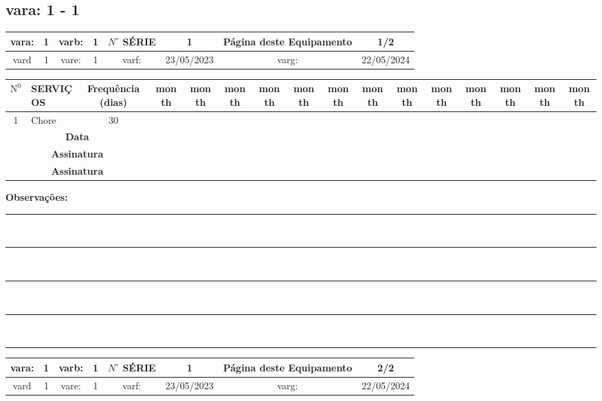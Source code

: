 \documentclass[a4paper, 12pt]{article}
\begin{document}
\subsection{vara: 1 - 1}



\begin{adjustbox}{width=18cm ,center}
\begin{tabular}{|c|c|c|c|c|c|c|c|}
\hline vara: & 1 & varb: & 1 & $N^{\circ}$ SÉRIE & 1 & \textbf{Página deste Equipamento} & \textbf{1/2} \\
\hline vard & 1 & vare: & 1 & varf: & 23/05/2023 & varg: & 22/05/2024 \\
\hline
\end{tabular}
\end{adjustbox}

\begin{adjustbox}{width=18cm ,center}
\begin{tabular}{|c|p{12cm}|c|c|c|c|c|c|c|c|c|c|c|c|c|c|}
\hline $\mathrm{N}^0$ & SERVIÇOS & Frequência (dias) & month & month & month & month & month & month & month & month & month & month & month & month & month \\
\hline 1 &  Chore & 30 &  &  & &  & &  &  & &  & &  &  &  \\
\hline
\hline
\multicolumn{3}{|c|}{\textbf{Data }} &  & & & & & & & &  &  & &  &  \\
\hline \multicolumn{3}{|c|}{\textbf{Assinatura }} &  & & & & & & & & & &   &  &  \\
\hline \multicolumn{3}{|c|}{\textbf{Assinatura }} &  & & & & & & & & & &   &  &  \\
\hline
\end{tabular}
\end{adjustbox}


\footnotesize\textbf{Observações:}\\[0.1cm]
\noindent\rule{\textwidth}{0.2mm} \\[0.1cm]
\noindent\rule{\textwidth}{0.2mm} \\[0.1cm]
\noindent\rule{\textwidth}{0.2mm} \\[0.1cm]
\noindent\rule{\textwidth}{0.2mm} \\[0.1cm]
\noindent\rule{\textwidth}{0.2mm}




\newpage
\begin{adjustbox}{width=18cm ,center}
\begin{tabular}{|c|c|c|c|c|c|c|c|}
\hline vara: & 1 & varb: & 1 & $N^{\circ}$ SÉRIE & 1 & \textbf{Página deste Equipamento} & \textbf{2/2} \\
\hline vard & 1 & vare: & 1 & varf: & 23/05/2023 & varg: & 22/05/2024 \\
\hline
\end{tabular}
\end{adjustbox}
\end{document}
